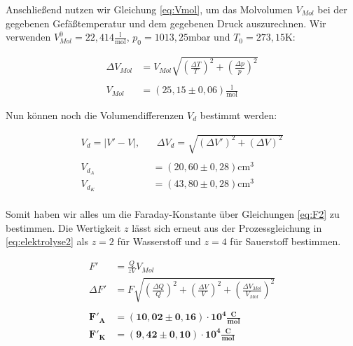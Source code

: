 \documentclass{article}
\begin{document}
Anschließend nutzen wir Gleichung \ref{eq:Vmol}, um das Molvolumen $V_{Mol}$ bei der gegebenen Gefäßtemperatur und dem gegebenen Druck auszurechnen. Wir verwenden $V_{Mol}^0 = 22,414 \frac{\text{l}}{\text{mol}}$, $p_0 = 1013,25$mbar und $T_0 = 273,15$K:

\begin{equation}
    \begin{split}
        \Delta V_{Mol} &= V_{Mol} \sqrt{\left( \frac{\Delta T}{T} \right)^2 + \left( \frac{\Delta p}{p} \right)^2} \\ \\
        V_{Mol} &= (25,15 \pm 0,06) \frac{\text{l}}{\text{mol}}
     \end{split}
\end{equation}

Nun können noch die Volumendifferenzen $V_d$ bestimmt werden:

\begin{equation}
    \begin{split}
        V_d = |V' - V|, \ \ & \ \ \Delta V_d = \sqrt{(\Delta V')^2 + (\Delta V)^2} \\ \\
        V_{d_A} &= (20,60 \pm 0,28) \text{cm}^3 \\
        V_{d_K} &= (43,80 \pm 0,28) \text{cm}^3 \\
    \end{split}
\end{equation}

Somit haben wir alles um die Faraday-Konstante über Gleichungen \ref{eq:F2} zu bestimmen. Die Wertigkeit $z$ lässt sich erneut aus der Prozessgleichung in \ref{eq:elektrolyse2} als $z=2$ für Wasserstoff und $z=4$ für Sauerstoff bestimmen.

\begin{equation}
    \begin{split}
        F' &= \frac{Q}{zV} V_{Mol} \\
        \Delta F' &= F \sqrt{\left( \frac{\Delta Q}{Q} \right)^2 + \left( \frac{\Delta V}{V} \right)^2 + \left( \frac{\Delta V_{Mol}}{V_{Mol}} \right)^2} \\ \\
        \bm{F'_A} &= \bm{(10,02 \pm 0,16) \cdot 10^{4} \frac{\textbf{C}}{\textbf{mol}}} \\
        \bm{F'_K} &= \bm{(9,42 \pm 0,10) \cdot 10^{4} \frac{\textbf{C}}{\textbf{mol}}} \\
    \end{split}
\end{equation}
\end{document}
